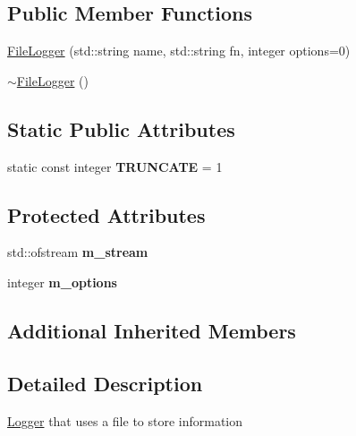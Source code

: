 \subsection*{Public Member Functions}
\begin{DoxyCompactItemize}
\item 
\hyperlink{classez_1_1logging_1_1FileLogger_a5fdc65717e3a95b6ceb59a8c1b2943b5}{File\+Logger} (std\+::string name, std\+::string fn, integer options=0)
\item 
\hyperlink{classez_1_1logging_1_1FileLogger_ab08af44f2de3fe1b51158132f9a399dd}{$\sim$\+File\+Logger} ()
\end{DoxyCompactItemize}
\subsection*{Static Public Attributes}
\begin{DoxyCompactItemize}
\item 
\mbox{\label{classez_1_1logging_1_1FileLogger_a0c9b0d3537b56031a895ee5aa942e0ad}} 
static const integer {\bfseries T\+R\+U\+N\+C\+A\+TE} = 1
\end{DoxyCompactItemize}
\subsection*{Protected Attributes}
\begin{DoxyCompactItemize}
\item 
\mbox{\label{classez_1_1logging_1_1FileLogger_a499080349a0e13f132c66e713d96a826}} 
std\+::ofstream {\bfseries m\+\_\+stream}
\item 
\mbox{\label{classez_1_1logging_1_1FileLogger_a15271eb566827586c5331adf2d71f179}} 
integer {\bfseries m\+\_\+options}
\end{DoxyCompactItemize}
\subsection*{Additional Inherited Members}


\subsection{Detailed Description}
\hyperlink{classez_1_1logging_1_1Logger}{Logger} that uses a file to store information 

